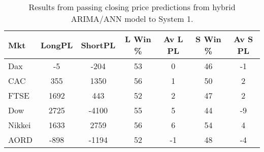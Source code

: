 \begin{table}[ht]
\centering
\caption[Results from passing closing price predictions from hybrid ARIMA/ANN model to System 1]{Results from passing closing price predictions from hybrid ARIMA/ANN model to System 1.} 
\label{tab:chp_ts:arima_ann_sys1}
\begin{tabular}{lcccccc}
  \toprule Mkt & LongPL & ShortPL & L Win \% & Av L PL & S Win \% & Av S PL \\ 
  \midrule Dax & -5 & -204 & 53 & 0 & 46 & -1 \\ 
  CAC & 355 & 1350 & 56 & 1 & 50 & 2 \\ 
  FTSE & 1692 & 443 & 52 & 2 & 47 & 2 \\ 
  Dow & 2725 & -4100 & 55 & 5 & 44 & -9 \\ 
  Nikkei & 1633 & 2759 & 56 & 6 & 54 & 4 \\ 
  AORD & -898 & -1194 & 52 & -1 & 48 & -4 \\ 
   \bottomrule \end{tabular}
\end{table}

